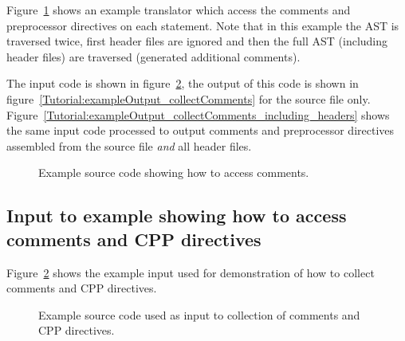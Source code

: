     Figure~\ref{Tutorial:example_collectComments}
shows an example translator which access the comments and preprocessor directives on each
statement. Note that in this example the AST is traversed twice, first header files are
ignored and then the full AST (including header files) are traversed (generated additional
comments).

The input code is shown in figure~\ref{Tutorial:exampleInputCode_collectComments},
the output of this code is shown in 
figure~\ref{Tutorial:exampleOutput_collectComments} for the source file only.
Figure~\ref{Tutorial:exampleOutput_collectComments_including_headers} shows the
same input code processed to output comments and preprocessor directives assembled from 
the source file {\em and} all header files.

\begin{figure}[!h]
{\indent
{\mySmallFontSize

\begin{latexonly}
   
\end{latexonly}

\begin{htmlonly}
   
\end{htmlonly}

}
}
\caption{Example source code showing how to access comments. }
\label{Tutorial:example_collectComments}
\end{figure}



\subsection{Input to example showing how to access comments and CPP directives}

   Figure~\ref{Tutorial:exampleInputCode_collectComments}
shows the example input used for demonstration of how to collect comments and CPP directives.

\begin{figure}[!h]
{\indent
{\mySmallFontSize

\begin{latexonly}
   
\end{latexonly}

\begin{htmlonly}
   
\end{htmlonly}

}
}
\caption{Example source code used as input to collection of comments and CPP directives.}
\label{Tutorial:exampleInputCode_collectComments}
\end{figure}



